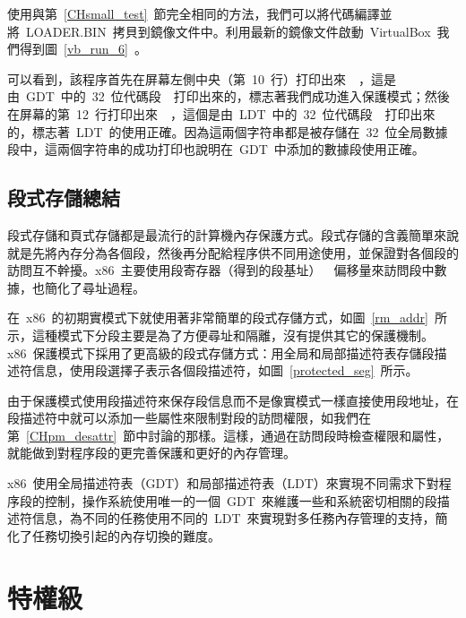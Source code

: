 使用與第~\ref{CHsmall_test}~節完全相同的方法，我們可以將代碼編譯並將~LOADER.BIN~拷貝到鏡像文件中。利用最新的鏡像文件啟動~VirtualBox~我們得到圖~\ref{vb_run_6}~。


可以看到，該程序首先在屏幕左側中央（第~10~行）打印出來~~，這是由~GDT~中的~32~位代碼段~~打印出來的，標志著我們成功進入保護模式；然後在屏幕的第~12~行打印出來~~，這個是由~LDT~中的~32~位代碼段~~打印出來的，標志著~LDT~的使用正確。因為這兩個字符串都是被存儲在~32~位全局數據段中，這兩個字符串的成功打印也說明在~GDT~中添加的數據段使用正確。

\subsection{段式存儲總結}

段式存儲和頁式存儲都是最流行的計算機內存保護方式。段式存儲的含義簡單來說就是先將內存分為各個段，然後再分配給程序供不同用途使用，並保證對各個段的訪問互不幹擾。x86~主要使用段寄存器（得到的段基址）~\code{+}~偏移量來訪問段中數據，也簡化了尋址過程。

在~x86~的初期實模式下就使用著非常簡單的段式存儲方式，如圖~\ref{rm_addr}~所示，這種模式下分段主要是為了方便尋址和隔離，沒有提供其它的保護機制。x86~保護模式下採用了更高級的段式存儲方式：用全局和局部描述符表存儲段描述符信息，使用段選擇子表示各個段描述符，如圖~\ref{protected_seg}~所示。

由于保護模式使用段描述符來保存段信息而不是像實模式一樣直接使用段地址，在段描述符中就可以添加一些屬性來限制對段的訪問權限，如我們在第~\ref{CHpm_desattr}~節中討論的那樣。這樣，通過在訪問段時檢查權限和屬性，就能做到對程序段的更完善保護和更好的內存管理。

x86~使用全局描述符表（GDT）和局部描述符表（LDT）來實現不同需求下對程序段的控制，操作系統使用唯一的一個~GDT~來維護一些和系統密切相關的段描述符信息，為不同的任務使用不同的~LDT~來實現對多任務內存管理的支持，簡化了任務切換引起的內存切換的難度。

\section{特權級}


